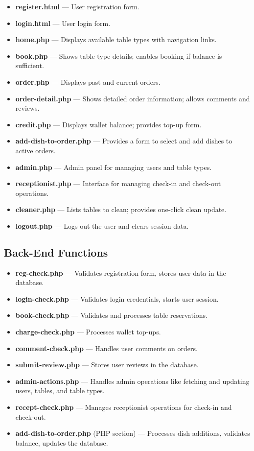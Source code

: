 \documentclass[12pt]{article}
\begin{document}
\begin{itemize}
    \item \textbf{register.html} — User registration form.
    \item \textbf{login.html} — User login form.
    \item \textbf{home.php} — Displays available table types with navigation links.
    \item \textbf{book.php} — Shows table type details; enables booking if balance is sufficient.
    \item \textbf{order.php} — Displays past and current orders.
    \item \textbf{order-detail.php} — Shows detailed order information; allows comments and reviews.
    \item \textbf{credit.php} — Displays wallet balance; provides top-up form.
    \item \textbf{add-dish-to-order.php} — Provides a form to select and add dishes to active orders.
    \item \textbf{admin.php} — Admin panel for managing users and table types.
    \item \textbf{receptionist.php} — Interface for managing check-in and check-out operations.
    \item \textbf{cleaner.php} — Lists tables to clean; provides one-click clean update.
    \item \textbf{logout.php} — Logs out the user and clears session data.
\end{itemize}

\subsection{Back-End Functions}

\begin{itemize}
    \item \textbf{reg-check.php} — Validates registration form, stores user data in the database.
    \item \textbf{login-check.php} — Validates login credentials, starts user session.
    \item \textbf{book-check.php} — Validates and processes table reservations.
    \item \textbf{charge-check.php} — Processes wallet top-ups.
    \item \textbf{comment-check.php} — Handles user comments on orders.
    \item \textbf{submit-review.php} — Stores user reviews in the database.
    \item \textbf{admin-actions.php} — Handles admin operations like fetching and updating users, tables, and table types.
    \item \textbf{recept-check.php} — Manages receptionist operations for check-in and check-out.
    \item \textbf{add-dish-to-order.php} (PHP section) — Processes dish additions, validates balance, updates the database.
\end{itemize}
\end{document}
